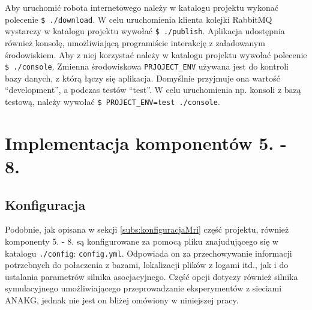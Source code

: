 Aby uruchomić robota internetowego należy w katalogu projektu wykonać polecenie
\texttt{\$ ./download}. W celu uruchomienia klienta kolejki RabbitMQ wystarczy w katalogu projektu wywołać \texttt{\$ ./publish}.
Aplikacja udostępnia również konsolę, umożliwiającą programiście interakcję z załadowanym środowiskiem. Aby z niej korzystać należy w katalogu projektu wywołać polecenie
\texttt{\$ ./console}. 
Zmienna środowiskowa \texttt{PRJOJECT\_ENV} używana jest do kontroli bazy danych, z którą łączy się aplikacja. Domyślnie przyjmuje ona wartość ``development'', a podczas testów
``test''. W celu uruchomienia np. konsoli z bazą testową, należy wywołać \texttt{\$ PROJECT\_ENV=test ./console}.

\section{Implementacja komponentów 5. - 8.}

\subsection{Konfiguracja}
\label{subs:konfiguracjaNeo4j}

Podobnie, jak opisana w sekcji \ref{subs:konfiguracjaMri} część projektu, również komponenty 5. - 8. są konfigurowane za pomocą pliku znajudującego się w katalogu 
\texttt{./config}: \texttt{config.yml}. Odpowiada on za przechowywanie informacji potrzebnych do połaczenia z bazami, lokalizacji plików z logami itd., jak i do 
ustalania parametrów silnika asocjacyjnego. Część opcji dotyczy również silnika symulacyjnego umożliwiającego przeprowadzanie eksperymentów z sieciami ANAKG, jednak
nie jest on bliżej omówiony w niniejszej pracy.

